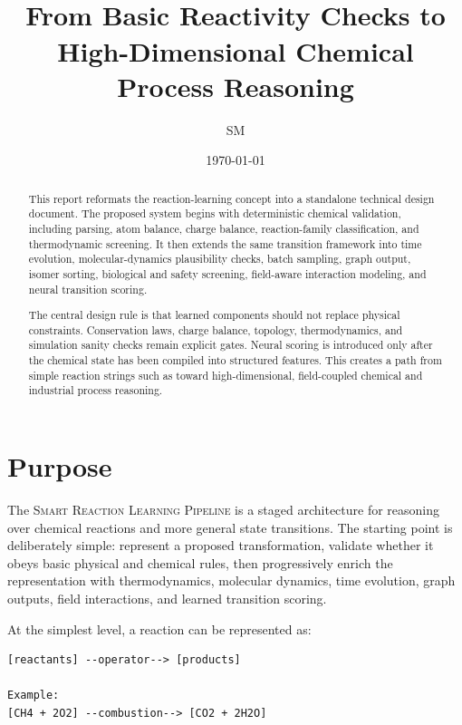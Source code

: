 \documentclass[11pt]{article}
\title{\pipeline\\
\large From Basic Reactivity Checks to High-Dimensional Chemical Process Reasoning}
\author{SM}
\date{\today}
\newcommand{\pipeline}{\textsc{Smart Reaction Learning Pipeline}}
\begin{document}
\maketitle

\begin{abstract}
This report reformats the reaction-learning concept into a standalone technical design document. The proposed system begins with deterministic chemical validation, including parsing, atom balance, charge balance, reaction-family classification, and thermodynamic screening. It then extends the same transition framework into time evolution, molecular-dynamics plausibility checks, batch sampling, graph output, isomer sorting, biological and safety screening, field-aware interaction modeling, and neural transition scoring.

The central design rule is that learned components should not replace physical constraints. Conservation laws, charge balance, topology, thermodynamics, and simulation sanity checks remain explicit gates. Neural scoring is introduced only after the chemical state has been compiled into structured features. This creates a path from simple reaction strings such as  toward high-dimensional, field-coupled chemical and industrial process reasoning.
\end{abstract}

\tableofcontents
\newpage

\section{Purpose}

The \pipeline{} is a staged architecture for reasoning over chemical reactions and more general state transitions. The starting point is deliberately simple: represent a proposed transformation, validate whether it obeys basic physical and chemical rules, then progressively enrich the representation with thermodynamics, molecular dynamics, time evolution, graph outputs, field interactions, and learned transition scoring.

At the simplest level, a reaction can be represented as:

\begin{lstlisting}[caption={Minimal transition notation}]
[reactants] --operator--> [products]

Example:
[CH4 + 2O2] --combustion--> [CO2 + 2H2O]
\end{lstlisting}
\end{document}

